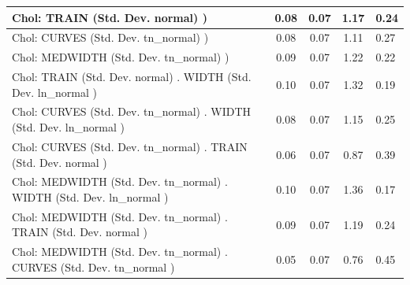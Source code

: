 \begin{table}
\begin{center}
\begin{tabular}{|l|l|c|c|c|l|}
			\hline
			 Chol: TRAIN (Std. Dev. normal) ) &  & 0.08 & 0.07 & 1.17 & 0.24 \\
			\hline
			 Chol: CURVES (Std. Dev. tn_normal) ) &  & 0.08 & 0.07 & 1.11 & 0.27 \\
			\hline
			 Chol: MEDWIDTH (Std. Dev. tn_normal) ) &  & 0.09 & 0.07 & 1.22 & 0.22 \\
			\hline
			 Chol: TRAIN (Std. Dev. normal) . WIDTH (Std. Dev.   ln_normal ) &  & 0.10 & 0.07 & 1.32 & 0.19 \\
			\hline
			 Chol: CURVES (Std. Dev. tn_normal) . WIDTH (Std. Dev.   ln_normal ) &  & 0.08 & 0.07 & 1.15 & 0.25 \\
			\hline
			 Chol: CURVES (Std. Dev. tn_normal) . TRAIN (Std. Dev.   normal ) &  & 0.06 & 0.07 & 0.87 & 0.39 \\
			\hline
			 Chol: MEDWIDTH (Std. Dev. tn_normal) . WIDTH (Std. Dev.   ln_normal ) &  & 0.10 & 0.07 & 1.36 & 0.17 \\
			\hline
			 Chol: MEDWIDTH (Std. Dev. tn_normal) . TRAIN (Std. Dev.   normal ) &  & 0.09 & 0.07 & 1.19 & 0.24 \\
			\hline
			 Chol: MEDWIDTH (Std. Dev. tn_normal) . CURVES (Std. Dev.   tn_normal ) &  & 0.05 & 0.07 & 0.76 & 0.45 \\
			\hline
		\end{tabular}
	\end{center}
\end{table}